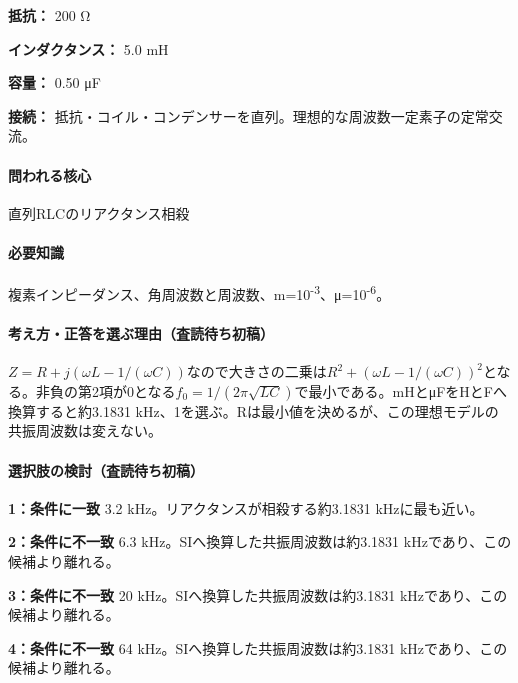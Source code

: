 \noindent\textbf{抵抗：} 200 Ω\par

\noindent\textbf{インダクタンス：} 5.0 mH\par

\noindent\textbf{容量：} 0.50 μF\par

\noindent\textbf{接続：} 抵抗・コイル・コンデンサーを直列。理想的な周波数一定素子の定常交流。\par

\paragraph{問われる核心} 直列RLCのリアクタンス相殺

\paragraph{必要知識} 複素インピーダンス、角周波数と周波数、m=\allowbreak{}10\textsuperscript{-3}、μ=10\textsuperscript{-6}。

\paragraph{考え方・正答を選ぶ理由（査読待ち初稿）} \(Z=R+j(\omega L-1/(\omega C))\)なので大きさの二乗は\(R^2+(\omega L-1/(\omega C))^2\)となる。非負の第2項が0となる\(f_0=1/(2\pi\sqrt{LC})\)で最小である。mHとμFをHとFへ換算すると約3.1831 kHz、1を選ぶ。Rは最小値を決めるが、この理想モデルの共振周波数は変えない。

\paragraph{選択肢の検討（査読待ち初稿）}\mbox{}\par

\noindent\textbf{1：条件に一致} 3.2 kHz。リアクタンスが相殺する約3.1831 kHzに最も近い。\par

\noindent\textbf{2：条件に不一致} 6.3 kHz。SIへ換算した共振周波数は約3.1831 kHzであり、この候補より離れる。\par

\noindent\textbf{3：条件に不一致} 20 kHz。SIへ換算した共振周波数は約3.1831 kHzであり、この候補より離れる。\par

\noindent\textbf{4：条件に不一致} 64 kHz。SIへ換算した共振周波数は約3.1831 kHzであり、この候補より離れる。\par


